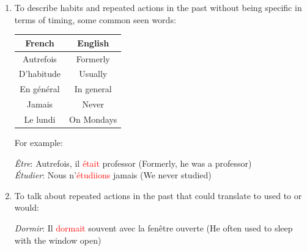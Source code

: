 \documentclass{book}
\begin{document}
\begin{enumerate}
    \item To describe habits and repeated actions in the past without being specific in terms of timing, some common seen words:
    \begin{center}
        \begin{tabular}{|c|c|}
            \hline
            \textbf{French} & \textbf{English} \\
            \hline
            Autrefois & Formerly \\
            \hline
            D'habitude & Usually \\
            \hline
            En général & In general \\
            \hline
            Jamais & Never \\
            \hline
            Le lundi & On Mondays \\
            \hline
        \end{tabular}
    \end{center}
    For example:
    \begin{center}
        \textit{Être}: Autrefois, il \textcolor{red}{était} professor (Formerly, he was a professor) \\
        \textit{Étudier}: Nous n'\textcolor{red}{étudiions} jamais (We never studied)
    \end{center}

    \item To talk about repeated actions in the past that could translate to used to or would:
    \begin{center}
        \textit{Dormir}: Il \textcolor{red}{dormait} souvent avec la fenêtre ouverte (He often used to sleep with the window open)  
    \end{center}


\end{enumerate}
\end{document}
